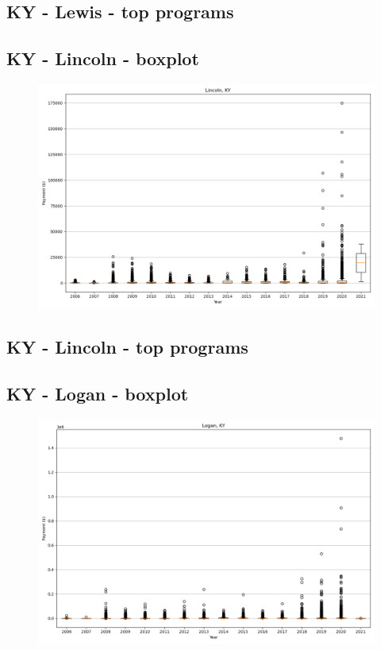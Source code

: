 \subsection*{KY - Lewis - top programs}

\newpage
\subsection*{KY - Lincoln - boxplot}
\begin{figure}[h]
\centering
\includegraphics[width=7in]{../output/boxplots/counties/Lincoln-KY_boxplot.png}
\end{figure}


\subsection*{KY - Lincoln - top programs}

\newpage
\subsection*{KY - Logan - boxplot}
\begin{figure}[h]
\centering
\includegraphics[width=7in]{../output/boxplots/counties/Logan-KY_boxplot.png}
\end{figure}


